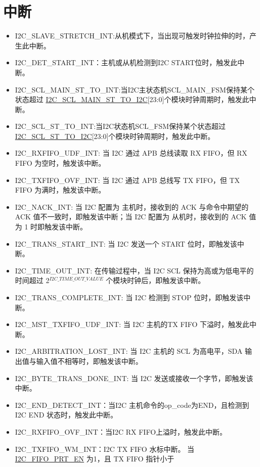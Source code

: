 \documentclass[main\_\_CN.tex]{subfiles}
\begin{document}
\section{中断}\label{sub:i2c-int}
\begin{itemize}
\item \label{int:i2c-slave-stretch}I2C\_SLAVE\_STRETCH\_INT:从机模式下，当出现可触发时钟拉伸的时，产生此中断。
\item \label{int:i2c-start}I2C\_DET\_START\_INT：主机或从机检测到I2C START位时，触发此中断。
\item \label{int:i2c-scl-main-fsm}I2C\_SCL\_MAIN\_ST\_TO\_INT:当I2C主状态机SCL\_MAIN\_FSM保持某个状态超过 \hyperref[fielddesc:I2CSCLMAINSTTOI2C]{I2C\_SCL\_MAIN\_ST\_TO\_I2C}[23:0]个模块时钟周期时，触发此中断。
\item \label{int:i2c-scl-fsm}I2C\_SCL\_ST\_TO\_INT:当I2C状态机SCL\_FSM保持某个状态超过 \hyperref[fielddesc:I2CSCLSTTOI2C]{I2C\_SCL\_ST\_TO\_I2C}[23:0]个模块时钟周期时，触发此中断。
\item \label{int:i2c-rxfifo-udf}I2C\_RXFIFO\_UDF\_INT: 当 I2C 通过 APB 总线读取 RX FIFO，但 RX FIFO 为空时，触发该中断。
\item \label{int:i2c-txfifo-ovf}I2C\_TXFIFO\_OVF\_INT: 当 I2C 通过 APB 总线写 TX FIFO，但 TX FIFO 为满时，触发该中断。
\item \label{int:i2c-nack}I2C\_NACK\_INT: 当 I2C 配置为 主机时，接收到的 ACK 与命令中期望的 ACK 值不一致时，即触发该中断；当 I2C 配置为 从机时，接收到的 ACK 值为 1 时即触发该中断。
\item \label{int:i2c-trans-start}I2C\_TRANS\_START\_INT: 当 I2C 发送一个 START 位时，即触发该中断。
\item \label{int:i2c-time-out}I2C\_TIME\_OUT\_INT: 在传输过程中，当 I2C SCL 保持为高或为低电平的时间超过 2$^{\hyperref[fielddesc:I2CTIMEOUTVALUE]{I2C\_TIME\_OUT\_VALUE}}$ 个模块时钟后，即触发该中断。
\item \label{int:i2c-trans-complete}I2C\_TRANS\_COMPLETE\_INT: 当 I2C 检测到 STOP 位时，即触发该中断。
\item \label{int:i2c-mst-txfifo-udf}I2C\_MST\_TXFIFO\_UDF\_INT: 当 I2C 主机的TX FIFO 下溢时，触发此中断。
\item \label{int:i2c-arbitration-lost}I2C\_ARBITRATION\_LOST\_INT: 当 I2C 主机的 SCL 为高电平，SDA 输出值与输入值不相等时，即触发该中断。
\item \label{int:i2c-byte-trans-done}I2C\_BYTE\_TRANS\_DONE\_INT: 当 I2C 发送或接收一个字节，即触发该中断。
\item \label{int:i2c-end}I2C\_END\_DETECT\_INT：当I2C 主机命令的op\_code为END，且检测到 I2C END 状态时，触发此中断。
\item \label{int:i2c-rxfifo-ovf}I2C\_RXFIFO\_OVF\_INT：当I2C RX FIFO上溢时，触发此中断。
\item \label{int:i2c-txfifo-wm}I2C\_TXFIFO\_WM\_INT：I2C TX FIFO 水标中断。 当\hyperref[fielddesc:I2CFIFOPRTEN]{I2C\_FIFO\_PRT\_EN} 为1，且 TX FIFO 指针小于


\end{itemize}
\end{document}
